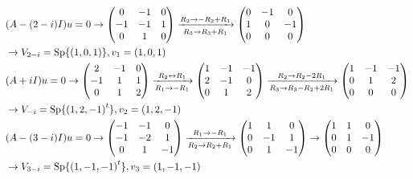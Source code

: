 \begin{align*}
	& (A - (2 - i) I) u = 0
	\rightarrow
	\begin{pmatrix}
		0 & -1 & 0 \\
		-1 & -1 & 1 \\
		0 & 1 & 0
	\end{pmatrix}
	\xrightarrow[R_3 \to R_3 + R_1]{R_2 \to -R_2 + R_1}
	\begin{pmatrix}
		0 & -1 & 0 \\
		1 & 0 & -1 \\
		0 & 0 & 0
	\end{pmatrix} \\
	& \rightarrow
	V_{2 -i} = \operatorname{Sp} \{ (1, 0, 1) \}, v_1 = (1, 0, 1) \\
	& (A + i I) u = 0
	\rightarrow
	\begin{pmatrix}
		2 & -1 & 0 \\
		-1 & 1 & 1 \\
		0 & 1 & 2
	\end{pmatrix}
	\xrightarrow[R_1 \to -R_1]{R_2 \leftrightarrow R_1}
	\begin{pmatrix}
		1 & -1 & -1 \\
		2 & -1 & 0 \\
		0 & 1 & 2
	\end{pmatrix}
	\xrightarrow[R_3 \to R_3 - R_2 + 2R_1]{R_2 \to R_2 - 2R_1}
	\begin{pmatrix}
		1 & -1 & -1 \\
		0 & 1 & 2 \\
		0 & 0 & 0
	\end{pmatrix} \\
	& \rightarrow
	V_{-i} = \operatorname{Sp}\{ {(1, 2, -1)}^t \}, v_2 = (1, 2, -1) \\
	& (A - (3 - i) I) u = 0
	\rightarrow
	\begin{pmatrix}
		-1 & -1 & 0 \\
		-1 & -2 & 1 \\
		0 & 1 & -1
	\end{pmatrix}
	\xrightarrow[R_2 \to R_2 + R_1]{R_1 \to - R_1}
	\begin{pmatrix}
		1 & 1 & 0 \\
		0 & -1 & 1 \\
		0 & 1 & -1
	\end{pmatrix}
	\rightarrow
	\begin{pmatrix}
		1 & 1 & 0 \\
		0 & 1 & -1 \\
		0 & 0 & 0
	\end{pmatrix} \\
	& \rightarrow V_{3 - i} = \operatorname{Sp}\{ {(1, -1, -1)}^t \}, v_3 = (1, -1, -1)
\end{align*}
